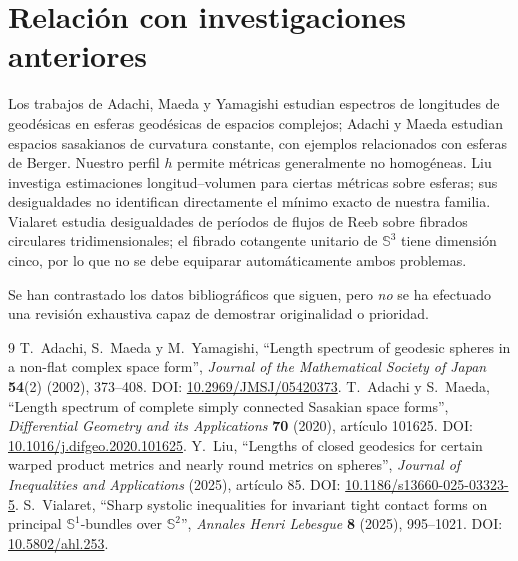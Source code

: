 \documentclass[11pt,a4paper]{article}
\theoremstyle{remark}\newtheorem{remark}[theorem]{Observación}
\newcommand{\Sthree}{\mathbb S^3}
\begin{document}
\section{Relación con investigaciones anteriores}
Los trabajos de Adachi, Maeda y Yamagishi estudian espectros de longitudes de geodésicas en esferas geodésicas de espacios complejos; Adachi y Maeda estudian espacios sasakianos de curvatura constante, con ejemplos relacionados con esferas de Berger. Nuestro perfil $h$ permite métricas generalmente no homogéneas. Liu investiga estimaciones longitud--volumen para ciertas métricas sobre esferas; sus desigualdades no identifican directamente el mínimo exacto de nuestra familia. Vialaret estudia desigualdades de períodos de flujos de Reeb sobre fibrados circulares tridimensionales; el fibrado cotangente unitario de $\Sthree$ tiene dimensión cinco, por lo que no se debe equiparar automáticamente ambos problemas.

Se han contrastado los datos bibliográficos que siguen, pero \emph{no} se ha efectuado una revisión exhaustiva capaz de demostrar originalidad o prioridad.

\begin{thebibliography}{9}
 T.~Adachi, S.~Maeda y M.~Yamagishi, ``Length spectrum of geodesic spheres in a non-flat complex space form'', \emph{Journal of the Mathematical Society of Japan} \textbf{54}(2) (2002), 373--408. DOI: \href{https://doi.org/10.2969/JMSJ/05420373}{10.2969/JMSJ/05420373}.
 T.~Adachi y S.~Maeda, ``Length spectrum of complete simply connected Sasakian space forms'', \emph{Differential Geometry and its Applications} \textbf{70} (2020), artículo 101625. DOI: \href{https://doi.org/10.1016/j.difgeo.2020.101625}{10.1016/j.difgeo.2020.101625}.
 Y.~Liu, ``Lengths of closed geodesics for certain warped product metrics and nearly round metrics on spheres'', \emph{Journal of Inequalities and Applications} (2025), artículo 85. DOI: \href{https://doi.org/10.1186/s13660-025-03323-5}{10.1186/s13660-025-03323-5}.
 S.~Vialaret, ``Sharp systolic inequalities for invariant tight contact forms on principal $\mathbb S^1$-bundles over $\mathbb S^2$'', \emph{Annales Henri Lebesgue} \textbf{8} (2025), 995--1021. DOI: \href{https://doi.org/10.5802/ahl.253}{10.5802/ahl.253}.
\end{thebibliography}
\end{document}
